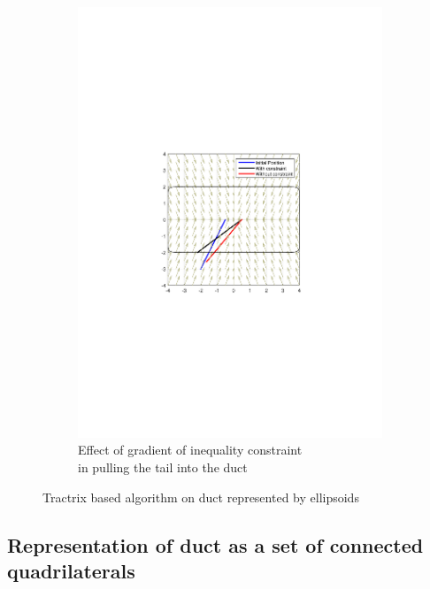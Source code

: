 \documentclass[12pt,a4]{article}
\begin{document}
\begin{figure}[ht!]
\begin{subfigure}{0.48\textwidth}
        \includegraphics[width=0.75\linewidth]{figures/fig6.pdf}
        \caption{Effect of gradient of inequality constraint\\ in pulling the tail into the duct \label{fig:gradienteffectSE}}
    \end{subfigure}
    \caption{ Tractrix based algorithm on duct represented by ellipsoids}
\end{figure}


\subsection{Representation of duct as a set of connected quadrilaterals}
\end{document}
